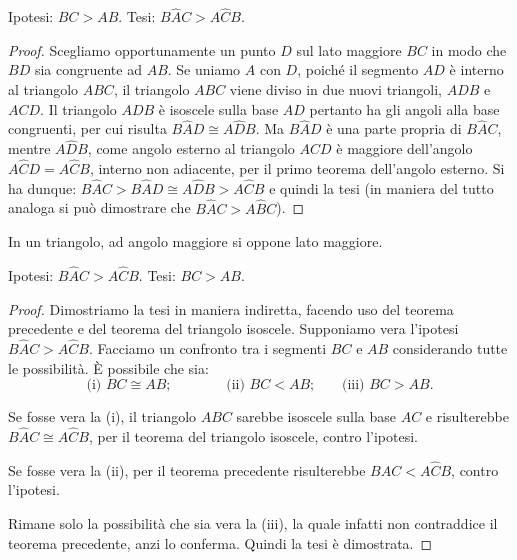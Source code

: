 \noindent\begin{minipage}{0.7\textwidth}
\noindent Ipotesi: \(BC>AB\). Tesi: \(B\widehat{A}C>A\widehat{C}B\).

\begin{proof}
Scegliamo opportunamente un punto \(D\) sul lato maggiore \(BC\) in modo 
che \(BD\) sia congruente ad \(AB\). Se uniamo \(A\) con \(D\), poiché il 
segmento \(AD\) è interno al triangolo \(ABC\), il triangolo \(ABC\) viene 
diviso in due nuovi triangoli, \(ADB\) e \(ACD\). Il triangolo \(ADB\) è 
isoscele sulla base \(AD\) pertanto ha gli angoli alla base congruenti, 
per cui risulta \(B\widehat{A}D\cong A\widehat{D}B\). Ma 
\(B\widehat{A}D\) è una parte propria di \(B\widehat{A}C\), mentre 
\(A\widehat{D}B\), come angolo esterno al triangolo \(ACD\) è maggiore 
dell'angolo \(A\widehat{C}D=A\widehat{C}B\), interno non adiacente, per 
il primo teorema dell'angolo esterno. Si ha dunque: 
\(B\widehat{A}C>B\widehat{A}D\cong A\widehat{D}B>A\widehat{C}B\) e 
quindi la tesi (in maniera del tutto analoga si può dimostrare che 
\(B\widehat{A}C>A\widehat{B}C\)).
\end{proof}
\end{minipage}\hfil
\begin{minipage}{0.3\textwidth}
\centering
\end{minipage}

\begin{teorema}
In un triangolo, ad angolo maggiore si oppone lato maggiore.
\end{teorema}

\noindent\begin{minipage}{0.7\textwidth}\parindent15pt 
\noindent Ipotesi: \(B\widehat{A}C>A\widehat{C}B\). Tesi: \(BC>AB\).

\noindent\begin{proof}
\noindent Dimostriamo la tesi in maniera indiretta, facendo uso del 
teorema precedente e del teorema del triangolo isoscele. Supponiamo 
vera l'ipotesi \(B\widehat{A}C>A\widehat{C}B\). Facciamo un confronto 
tra i segmenti \(BC\) e \(AB\) considerando tutte le possibilità. \`E 
possibile che sia:
\[\text{(i) }BC\cong AB\text{;}\qquad\qquad \text{(ii) 
}BC<AB\text{;}\quad\quad\text{(iii) }BC>AB\text{.}\]

Se fosse vera la (i), il triangolo \(ABC\) sarebbe isoscele sulla base 
\(AC\) e risulterebbe \(B\widehat{A}C\cong A\widehat{C}B\), per il 
teorema del triangolo isoscele, contro l'ipotesi.

Se fosse vera la (ii), per il teorema precedente risulterebbe 
\(B\widehat{A}C<A\widehat{C}B\), contro l'ipotesi.

Rimane solo la possibilità che sia vera la (iii), la quale infatti 
non contraddice il teorema precedente, anzi lo conferma. Quindi la 
tesi è dimostrata.
\end{proof}
\end{minipage}\hfil
\begin{minipage}{0.3\textwidth}
\centering
\end{minipage}
~\\

